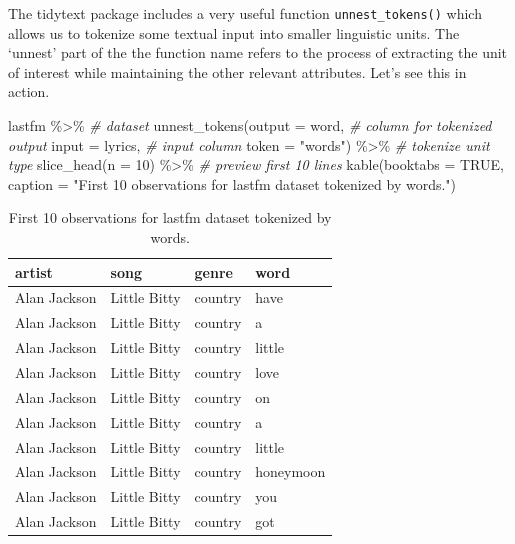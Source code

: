 \documentclass[
]{article}
\newenvironment{Shaded}{\begin{snugshade}}{\end{snugshade}}
\newcommand{\AttributeTok}[1]{\textcolor[rgb]{0.77,0.63,0.00}{#1}}
\newcommand{\CommentTok}[1]{\textcolor[rgb]{0.56,0.35,0.01}{\textit{#1}}}
\newcommand{\ConstantTok}[1]{\textcolor[rgb]{0.00,0.00,0.00}{#1}}
\newcommand{\DecValTok}[1]{\textcolor[rgb]{0.00,0.00,0.81}{#1}}
\newcommand{\FunctionTok}[1]{\textcolor[rgb]{0.00,0.00,0.00}{#1}}
\newcommand{\NormalTok}[1]{#1}
\newcommand{\SpecialCharTok}[1]{\textcolor[rgb]{0.00,0.00,0.00}{#1}}
\newcommand{\StringTok}[1]{\textcolor[rgb]{0.31,0.60,0.02}{#1}}
\begin{document}
The tidytext package includes a very useful function \texttt{unnest\_tokens()} which allows us to tokenize some textual input into smaller linguistic units. The `unnest' part of the the function name refers to the process of extracting the unit of interest while maintaining the other relevant attributes. Let's see this in action.

\begin{Shaded}
\begin{Highlighting}[]
\NormalTok{lastfm }\SpecialCharTok{\%\textgreater{}\%} \CommentTok{\# dataset}
  \FunctionTok{unnest\_tokens}\NormalTok{(}\AttributeTok{output =}\NormalTok{ word, }\CommentTok{\# column for tokenized output}
                \AttributeTok{input =}\NormalTok{ lyrics, }\CommentTok{\# input column}
                \AttributeTok{token =} \StringTok{"words"}\NormalTok{) }\SpecialCharTok{\%\textgreater{}\%} \CommentTok{\# tokenize unit type}
  \FunctionTok{slice\_head}\NormalTok{(}\AttributeTok{n =} \DecValTok{10}\NormalTok{) }\SpecialCharTok{\%\textgreater{}\%}  \CommentTok{\# preview first 10 lines}
  \FunctionTok{kable}\NormalTok{(}\AttributeTok{booktabs =} \ConstantTok{TRUE}\NormalTok{,}
        \AttributeTok{caption =} \StringTok{"First 10 observations for lastfm dataset tokenized by words."}\NormalTok{)}
\end{Highlighting}
\end{Shaded}

\begin{table}

\caption{\label{tab:td-lastfm-tokenize-words}First 10 observations for lastfm dataset tokenized by words.}
\centering
\begin{tabular}[t]{llll}
\toprule
artist & song & genre & word\\
\midrule
Alan Jackson & Little Bitty & country & have\\
Alan Jackson & Little Bitty & country & a\\
Alan Jackson & Little Bitty & country & little\\
Alan Jackson & Little Bitty & country & love\\
Alan Jackson & Little Bitty & country & on\\
\addlinespace
Alan Jackson & Little Bitty & country & a\\
Alan Jackson & Little Bitty & country & little\\
Alan Jackson & Little Bitty & country & honeymoon\\
Alan Jackson & Little Bitty & country & you\\
Alan Jackson & Little Bitty & country & got\\
\bottomrule
\end{tabular}
\end{table}
\end{document}
